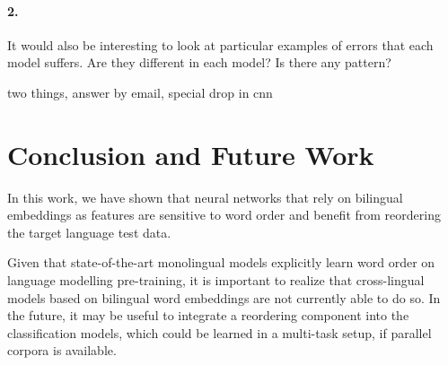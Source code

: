 \documentclass[11pt,a4paper]{article}
\begin{document}
\paragraph{2. }It would also be interesting 
to look at particular examples 
of errors that each model suffers.
Are they different in each model?
Is there any pattern?

two things, answer by email, special drop in cnn


\section{Conclusion and Future Work}

In this work, we have shown that neural networks that rely on bilingual embeddings as features
are sensitive to word order and benefit from reordering the target language test data. 

Given that state-of-the-art monolingual models explicitly learn word order on language modelling pre-training, it is important to realize that cross-lingual models based on bilingual word embeddings are not currently able to do so. In the future, it may be useful to integrate a reordering component into the classification models, which could be learned in a multi-task setup, if parallel corpora is available.




\end{document}
